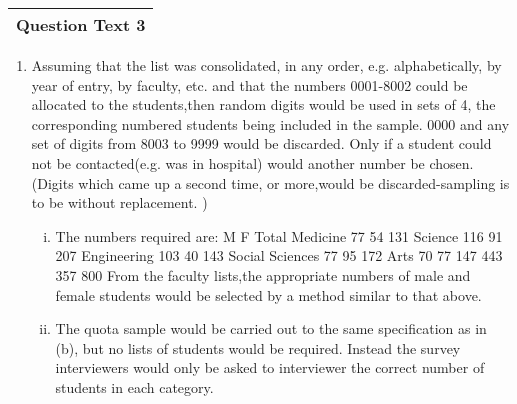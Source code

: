 \documentclass[a4paper,12pt]{article}
\begin{document}
\begin{table}[ht!]
 \centering
 \begin{tabular}{|p{15cm}|}
 \hline  
Question Text 3 
\\ \hline
  \end{tabular}
\end{table}
\begin{enumerate}
    \item Assuming that the list was consolidated, in any order, e.g. alphabetically, by year
of entry, by faculty, etc. and that the numbers 0001-8002 could be allocated to the
students,then random digits would be used in sets of 4, the corresponding numbered
students being included in the sample. 0000 and any set of digits from 8003 to
9999 would be discarded. Only if a student could not be contacted(e.g. was in
hospital) would another number be chosen. (Digits which came up a second time,
or more,would be discarded-sampling is to be without replacement. )
\begin{enumerate}[(i)]
\item  The numbers required are:
M F Total
Medicine 77 54 131
Science 116 91 207
Engineering 103 40 143
Social Sciences 77 95 172
Arts 70 77 147
443 357 800
From the faculty lists,the appropriate numbers of male and female students would
be selected by a method similar to that above.
\item The quota sample would be carried out to the same specification as in (b), but no
lists of students would be required. Instead the survey interviewers would only be
asked to interviewer the correct number of students in each category.
\end{enumerate}


\end{enumerate}
\end{document}
